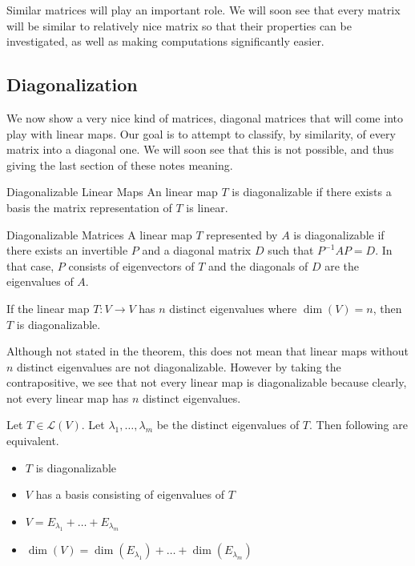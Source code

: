 Similar matrices will play an important role. We will soon see that every matrix will be similar to relatively nice matrix so that their properties can be investigated, as well as making computations significantly easier. 

\subsection{Diagonalization}
We now show a very nice kind of matrices, diagonal matrices that will come into play with linear maps. Our goal is to attempt to classify, by similarity, of every matrix into a diagonal one. We will soon see that this is not possible, and thus giving the last section of these notes meaning. 

\begin{defn}{Diagonalizable Linear Maps}{} An linear map $T$ is diagonalizable if there exists a basis the matrix representation of $T$ is linear. 
\end{defn}

\begin{prp}{Diagonalizable Matrices}{} A linear map $T$ represented by $A$ is diagonalizable if there exists an invertible $P$ and a diagonal matrix $D$ such that $P^{-1}AP=D$. In that case, $P$ consists of eigenvectors of $T$ and the diagonals of $D$ are the eigenvalues of $A$. 
\end{prp}

\begin{thm}{}{} If the linear map $T:V\to V$ has $n$ distinct eigenvalues where $\dim(V)=n$, then $T$ is diagonalizable. 
\end{thm}

Although not stated in the theorem, this does not mean that linear maps without $n$ distinct eigenvalues are not diagonalizable. However by taking the contrapositive, we see that not every linear map is diagonalizable because clearly, not every linear map has $n$ distinct eigenvalues. 

\begin{thm}{}{} Let $T\in\mathcal{L}(V)$. Let $\lambda_1,\dots,\lambda_m$ be the distinct eigenvalues of $T$. Then following are equivalent. 
\begin{itemize}
\item $T$ is diagonalizable
\item $V$ has a basis consisting of eigenvalues of $T$
\item $V=E_{\lambda_1}+\dots+E_{\lambda_m}$
\item $\dim(V)=\dim(E_{\lambda_1})+\dots+\dim(E_{\lambda_m})$
\end{itemize}
\end{thm}


